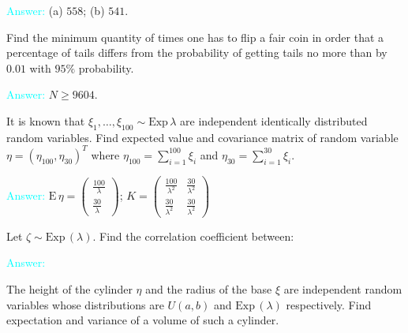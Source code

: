 \documentclass[14pt]{exam}
\def\E{{\textrm{E}}\,}
\def\Exp{{\textrm{Exp}}\,}
\begin{document}
\begin{questions}
		\textcolor{cyan}{Answer:} (a) $558$; (b) $541$.
		
		\question
		Find the minimum quantity of times one has to flip a fair coin in order that a percentage of tails differs from the probability of getting tails no more than by $0.01$ with $95\%$ probability.
		
		\textcolor{cyan}{Answer:} $N \geq 9604$.
		
		
		\question
		It is known that $\xi_1,\dots,\xi_{100} \sim \Exp{\lambda}$ are independent identically distributed random variables. Find expected value and covariance matrix of random variable $\eta = (\eta_{100}, \eta_{30})^T$ where $\eta_{100} = \sum_{i=1}^{100} \xi_i$ and $\eta_{30} = \sum_{i=1}^{30} \xi_i$.
		
		\textcolor{cyan}{Answer:} $\E\eta = \begin{pmatrix}
			\frac{100}{\lambda}\\
			\frac{30}{\lambda}
		\end{pmatrix}$;
		$K = \begin{pmatrix}
			\frac{100}{\lambda^2} & \frac{30}{\lambda^2}\\
			\frac{30}{\lambda^2} & \frac{30}{\lambda^2}
		\end{pmatrix}$
		
		\question
		Let $\zeta \sim \Exp(\lambda)$. Find the correlation coefficient between:
		\textcolor{cyan}{Answer:}
		
		\question
		The height of the cylinder $\eta$ and the radius of the base $\xi$ are independent random variables whose distributions are $U(a, b)$ and $\Exp(\lambda)$ respectively. Find expectation and variance of a volume of such a cylinder.
		

\end{questions}
\end{document}
